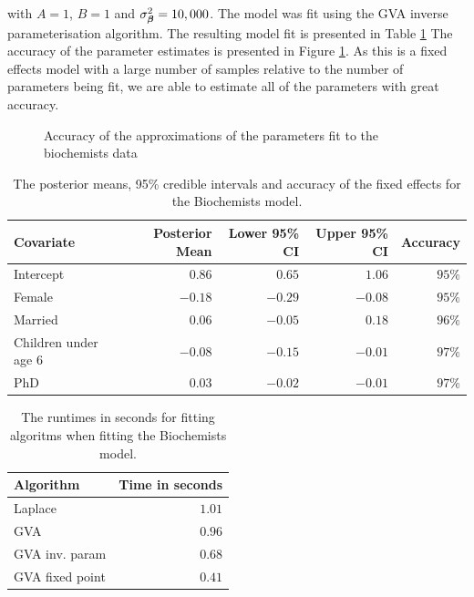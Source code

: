 \noindent with $A=1$, $B=1$ and $\sigma_{\boldsymbol \beta}^2 = 10,000$. The model was fit
using the GVA inverse parameterisation algorithm. The resulting model fit is
presented in Table \ref{tab:biochemists_results} The accuracy of the parameter
estimates is presented in Figure \ref{fig:biochemists}. As this is a fixed
effects model with a large number of samples relative to the number of
parameters being fit, we are able to estimate all of the parameters with great
accuracy.

\begin{figure}[h]
\centering
\label{fig:biochemists}
\caption{Accuracy of the approximations of the parameters fit to the biochemists data}
\end{figure}

\begin{table}
	\begin{tabular}{|l|rrrr|}
		\hline
		Covariate          & Posterior Mean & Lower 95\% CI & Upper 95\% CI & Accuracy \\
		\hline
		Intercept & $0.86$ & $0.65$ & $1.06$ &  $95\%$ \\
		Female & $-0.18$ & $-0.29$ & $-0.08$ &  $95\%$ \\
		Married & $0.06$ & $-0.05$ & $0.18$ & $96\%$ \\
		Children under age 6 & $-0.08$ & $-0.15$ & $-0.01$ & $97\%$ \\
		PhD & $0.03$ & $-0.02$ & $-0.01$ & $97\%$ \\
		\hline
	\end{tabular}			
	\label{tab:biochemists_results}
	\caption{The posterior means, 95\% credible intervals and accuracy of the fixed effects for the 
						Biochemists model.}
\end{table}

\begin{table}
	\begin{tabular}{|l|r|}
	\hline
	Algorithm & Time in seconds \\
	\hline
	Laplace & $1.01$ \\
	GVA & $0.96$ \\
	GVA inv. param & $0.68$ \\
	GVA fixed point & $0.41$ \\
	\hline
	\end{tabular}
	\label{tab:biochemists_runtime}
	\caption{The runtimes in seconds for fitting algoritms when fitting the Biochemists model.}
\end{table}

